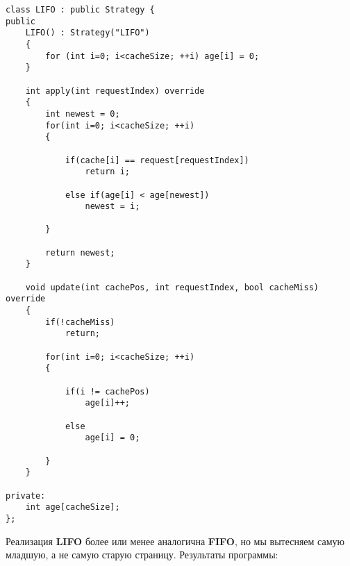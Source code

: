 \begin{tcolorbox}
\begin{verbatim}
class LIFO : public Strategy {
public
    LIFO() : Strategy("LIFO")
    {
        for (int i=0; i<cacheSize; ++i) age[i] = 0;
    }
    
    int apply(int requestIndex) override
    {
        int newest = 0;
        for(int i=0; i<cacheSize; ++i)
        {
        
            if(cache[i] == request[requestIndex])
                return i;
            
            else if(age[i] < age[newest])
                newest = i;
        
        }
        
        return newest;
    }
    
    void update(int cachePos, int requestIndex, bool cacheMiss) override
    {
        if(!cacheMiss)
            return;
        
        for(int i=0; i<cacheSize; ++i)
        {
        
            if(i != cachePos)
                age[i]++;
            
            else
                age[i] = 0;
        
        }
    }
    
private:
    int age[cacheSize];
};
\end{verbatim}
\end{tcolorbox}

Реализация \textbf{LIFO} более или менее аналогична \textbf{FIFO}, но мы вытесняем самую младшую, а не самую старую страницу. Результаты программы:

